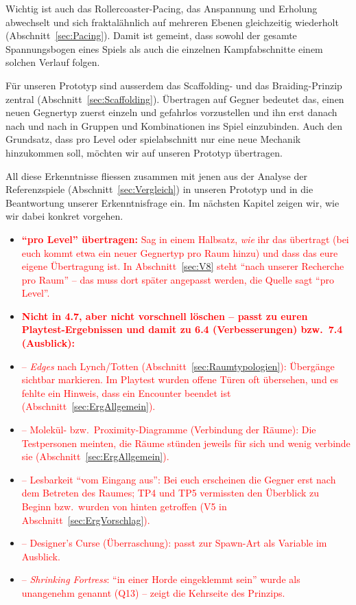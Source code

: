 \documentclass[../Main.tex]{subfiles}
\begin{document}
Wichtig ist auch das Rollercoaster-Pacing, das Anspannung und Erholung abwechselt und sich fraktalähnlich auf mehreren Ebenen gleichzeitig wiederholt (Abschnitt~\ref{sec:Pacing}). Damit ist gemeint, dass sowohl der gesamte Spannungsbogen eines Spiels als auch die einzelnen Kampfabschnitte einem solchen Verlauf folgen.

Für unseren Prototyp sind ausserdem das Scaffolding- und das Braiding-Prinzip zentral (Abschnitt~\ref{sec:Scaffolding}). Übertragen auf Gegner bedeutet das, einen neuen Gegnertyp zuerst einzeln und gefahrlos vorzustellen und ihn erst danach nach und nach in Gruppen und Kombinationen ins Spiel einzubinden. Auch den Grundsatz, dass pro Level oder spielabschnitt nur eine neue Mechanik hinzukommen soll, möchten wir auf unseren Prototyp übertragen.

All diese Erkenntnisse fliessen zusammen mit jenen aus der Analyse der Referenzspiele (Abschnitt~\ref{sec:Vergleich}) in unseren Prototyp und in die Beantwortung unserer Erkenntnisfrage ein. Im nächsten Kapitel zeigen wir, wie wir dabei konkret vorgehen.

\begin{itemize}[leftmargin=1.5cm]
    \item \textcolor{red}{\textbf{\enquote{pro Level} übertragen:} Sag in einem Halbsatz, \emph{wie} ihr das übertragt (bei euch kommt etwa ein neuer Gegnertyp pro Raum hinzu) und dass das eure eigene Übertragung ist. In Abschnitt~\ref{sec:V8} steht \enquote{nach unserer Recherche pro Raum} -- das muss dort später angepasst werden, die Quelle sagt \enquote{pro Level}.}
    \item \textcolor{red}{\textbf{Nicht in 4.7, aber nicht vorschnell löschen -- passt zu euren Playtest-Ergebnissen und damit zu 6.4 (Verbesserungen) bzw.\ 7.4 (Ausblick):}}
    \item \textcolor{red}{-- \textit{Edges} nach Lynch/Totten (Abschnitt~\ref{sec:Raumtypologien}): Übergänge sichtbar markieren. Im Playtest wurden offene Türen oft übersehen, und es fehlte ein Hinweis, dass ein Encounter beendet ist (Abschnitt~\ref{sec:ErgAllgemein}).}
    \item \textcolor{red}{-- Molekül- bzw.\ Proximity-Diagramme (Verbindung der Räume): Die Testpersonen meinten, die Räume stünden jeweils für sich und wenig verbinde sie (Abschnitt~\ref{sec:ErgAllgemein}).}
    \item \textcolor{red}{-- Lesbarkeit \enquote{vom Eingang aus}: Bei euch erscheinen die Gegner erst nach dem Betreten des Raumes; TP4 und TP5 vermissten den Überblick zu Beginn bzw.\ wurden von hinten getroffen (V5 in Abschnitt~\ref{sec:ErgVorschlag}).}
    \item \textcolor{red}{-- Designer's Curse (Überraschung): passt zur Spawn-Art als Variable im Ausblick.}
    \item \textcolor{red}{-- \textit{Shrinking Fortress}: \enquote{in einer Horde eingeklemmt sein} wurde als unangenehm genannt (Q13) -- zeigt die Kehrseite des Prinzips.}
\end{itemize}
\end{document}
